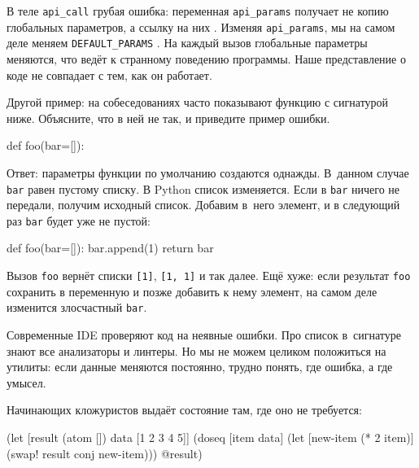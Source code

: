 \fi


В теле \verb|api_call| грубая ошибка: переменная \verb|api_params| получает
не копию глобальных параметров, а ссылку на них \ifnarrow{}\else{}\fi.
Изменяя \verb|api_params|, мы на самом деле меняем \verb|DEFAULT_PARAMS|
\ifnarrow{}\else{}\fi. На каждый вызов
глобальные параметры меняются, что ведёт к странному поведению программы.
Наше представление о коде не совпадает с тем, как он работает.

Другой пример: на собеседованиях часто показывают функцию с сигнатурой
ниже. Объясните, что в ней не так, и приведите пример ошибки.

\begin{english}
  \begin{python}
def foo(bar=[]):
  \end{python}
\end{english}

Ответ: параметры функции по умолчанию создаются однажды. В~данном случае
\verb|bar| равен пустому списку. В Python список изменяется. Если в
\verb|bar| ничего не передали, получим исходный список. Добавим в~него
элемент, и в следующий раз \verb|bar| будет уже не пустой:

\begin{english}
  \begin{python}
def foo(bar=[]):
    bar.append(1)
    return bar
  \end{python}
\end{english}

Вызов \verb|foo| вернёт списки \verb|[1]|, \verb|[1, 1]| и так
далее. Ещё хуже: если результат \verb|foo| сохранить в переменную и позже
добавить к нему элемент, на самом деле изменится злосчастный \verb|bar|.

Современные IDE проверяют код на неявные ошибки. Про список в~сигнатуре знают
все анализаторы и линтеры. Но мы не можем целиком положиться на утилиты: если
данные меняются постоянно, трудно понять, где ошибка, а где умысел.

Начинающих кложуристов выдаёт состояние там, где оно не требуется:

\begin{english}
  \begin{clojure}
(let [result (atom [])
      data [1 2 3 4 5]]
  (doseq [item data]
    (let [new-item (* 2 item)]
      (swap! result conj new-item)))
  @result)
  \end{clojure}
\end{english}

